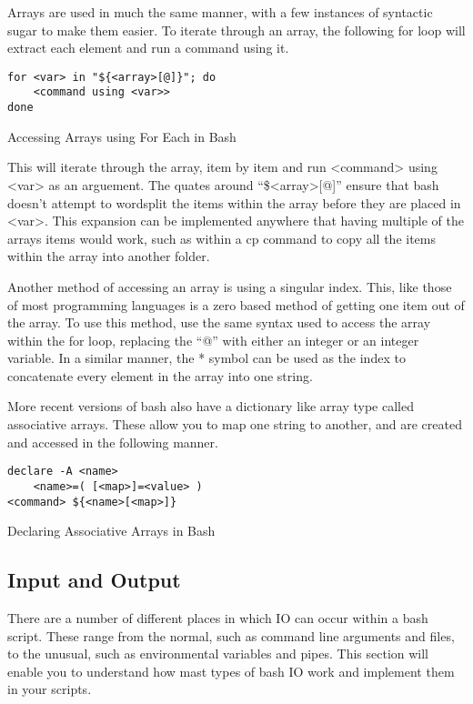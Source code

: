 			Arrays are used in much the same manner, with a few instances of syntactic sugar to make them easier.
			To iterate through an array, the following for loop will extract each element and run a command using it.
			\begin{code}
			\begin{verbatim}
for <var> in "${<array>[@]}"; do
	<command using <var>>
done
			\end{verbatim}
			\label{code:ForEachArrayAccess}
			\caption{Accessing Arrays using For Each in Bash}
			\end{code}
			This will iterate through the array, item by item and run <command> using <var> as an arguement.
			The quates around ``\$<array>[@]'' ensure that bash doesn't attempt to wordsplit the items within the array before they are placed in <var>.
			This expansion can be implemented anywhere that having multiple of the arrays items would work, such as within a cp command to copy all the items within the array into another folder.

			Another method of accessing an array is using a singular index.
			This, like those of most programming languages is a zero based method of getting one item out of the array.
			To use this method, use the same syntax used to access the array within the for loop, replacing the ``@'' with either an integer or an integer variable.
			In a similar manner, the \** symbol can be used as the index to concatenate every element in the array into one string.

			More recent versions of bash also have a dictionary like array type called associative arrays.
			These allow you to map one string to another, and are created and accessed in the following manner.
			\begin{code}
			\begin{verbatim}
declare -A <name>
	<name>=( [<map>]=<value> )
<command> ${<name>[<map>]}
			\end{verbatim}
			\label{code:DeclareAssociativeArrayBash}
			\caption{Declaring Associative Arrays in Bash}
			\end{code}

		\subsection{Input and Output}
			There are a number of different places in which IO can occur within a bash script.
			These range from the normal, such as command line arguments and files, to the unusual, such as environmental variables and pipes.
			This section will enable you to understand how mast types of bash IO work and implement them in your scripts.

